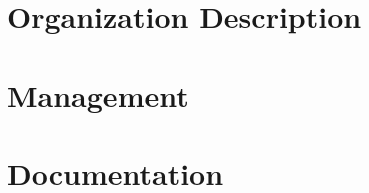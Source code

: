 \documentclass[a4paper,twoside,11pt]{article}
\begin{document}
    

    \baselineskip 18pt
    \newpage

    \setcounter{page}{1}

    \section{Organization Description}\label{sec:organization-description}
    

    \section{Management}\label{sec:management}
    

    \section{Documentation}\label{sec:documentation}
    
\end{document}
